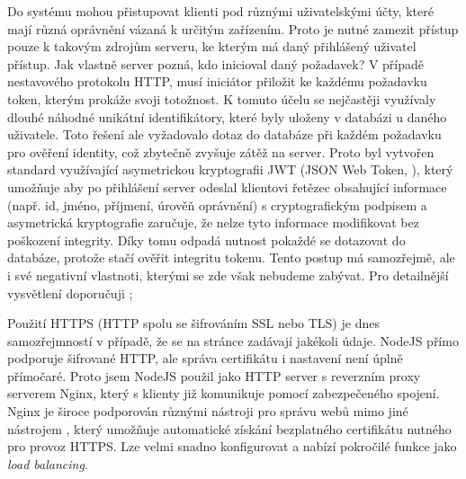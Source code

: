 Do systému mohou přistupovat klienti pod různými uživatelskými účty, které mají různá oprávnění vázaná k určitým zařízením. Proto je nutné zamezit přístup pouze k takovým zdrojům serveru, ke kterým má daný přihlášený uživatel přístup. Jak vlastně server pozná, kdo inicioval daný požadavek? V případě nestavového protokolu HTTP, musí iniciátor přiložit ke každému požadavku token, kterým prokáže svoji totožnost. K tomuto účelu se nejčastěji využívaly dlouhé náhodné unikátní identifikátory, které byly uloženy v databázi u daného uživatele. Toto řešení ale vyžadovalo dotaz do databáze při každém požadavku pro ověření identity, což zbytečně zvyšuje zátěž na server. Proto byl vytvořen standard využívající asymetrickou kryptografii JWT (JSON Web Token, \cite[RFC 7519]{rfc-jwt}), který umožňuje aby po přihlášení server odeslal klientovi řetězec obsahující informace (např. id, jméno, příjmení, úrověň oprávnění) s cryptografickým podpisem a asymetrická kryptografie zaručuje, že nelze tyto informace modifikovat bez poškození integrity. Díky tomu odpadá nutnost pokaždé se dotazovat do databáze, protože stačí ověřit integritu tokenu. Tento postup má samozřejmě, ale i své negativní vlastnoti, kterými se zde však nebudeme zabývat. Pro detailnější vysvětlení doporučuji \cite{jwt-cons};

Použití HTTPS (HTTP spolu se šifrováním SSL nebo TLS) je dnes samozřejmností v případě, že se na stránce zadávají jakékoli údaje. NodeJS přímo podporuje šifrované HTTP, ale správa certifikátu i nastavení není úplně přímočaré. Proto jsem NodeJS použil jako HTTP server s reverzním proxy serverem Nginx, který s klienty již komunikuje pomocí zabezpečeného spojení. Nginx je široce podporován různými nástroji pro správu webů mimo jiné nástrojem , který umožňuje automatické získání bezplatného certifikátu nutného pro provoz HTTPS. Lze velmi snadno konfigurovat a nabízí pokročilé funkce jako \textit{load balancing}.


